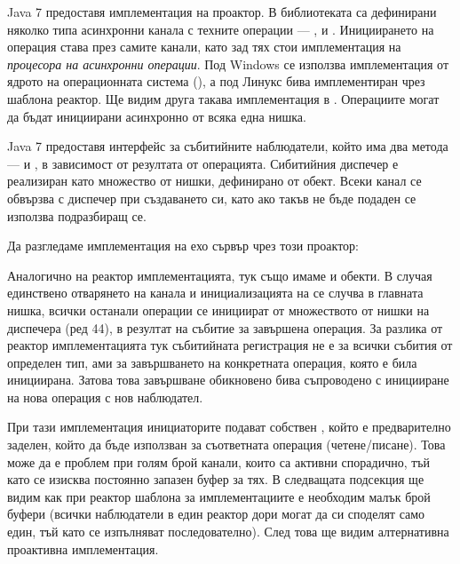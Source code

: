 Java 7 предоставя имплементация на проактор. В библиотеката са дефинирани няколко типа асинхронни канала с техните операции — ,  и . Инициирането на операция става през самите канали, като зад тях стои имплементация на \emph{процесора на асинхронни операции}. Под Windows се използва имплементация от ядрото на операционната система (), а под Линукс бива имплементиран чрез шаблона реактор. Ще видим друга такава имплементация в . Операциите могат да бъдат инициирани асинхронно от всяка една нишка.

Java 7 предоставя интерфейс  за събитийните наблюдатели, който има два метода —  и , в зависимост от резултата от операцията. Сибитийния диспечер е реализиран като множество от нишки, дефинирано от  обект. Всеки канал се обвързва с диспечер при създаването си, като ако такъв не бъде подаден се използва подразбиращ се.

Да разгледаме имплементация на ехо сървър чрез този проактор:



Аналогично на реактор имплементацията, тук също имаме  и  обекти. В случая единствено отварянето на канала и инициализацията на  се случва в главната нишка, всички останали операции се инициират от множеството от нишки на диспечера (ред 44), в резултат на събитие за завършена операция. За разлика от реактор имплементацията тук събитийната регистрация не е за всички събития от определен тип, ами за завършването на конкретната операция, която е била инициирана. Затова това завършване обикновено бива съпроводено с иницииране на нова операция с нов наблюдател.

При тази имплементация инициаторите подават собствен , който е предварително заделен, който да бъде използван за съответната операция (четене/писане). Това може да е проблем при голям брой канали, които са активни спорадично, тъй като се изисква постоянно запазен буфер за тях. В следващата подсекция ще видим как при реактор шаблона за имплементациите е необходим малък брой буфери (всички наблюдатели в един реактор дори могат да си споделят само един, тъй като се изпълняват последователно). След това ще видим алтернативна проактивна имплементация.

